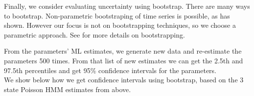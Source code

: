 \documentclass[bimj,fleqn]{w-art}\usepackage[]{graphicx}\usepackage[]{color}
\makeatletter
\newcommand{\hlnum}[1]{\textcolor[rgb]{0.686,0.059,0.569}{#1}}%
\newcommand{\hlcom}[1]{\textcolor[rgb]{0.678,0.584,0.686}{\textit{#1}}}%
\newcommand{\hlopt}[1]{\textcolor[rgb]{0,0,0}{#1}}%
\newcommand{\hlstd}[1]{\textcolor[rgb]{0.345,0.345,0.345}{#1}}%
\newcommand{\hlkwa}[1]{\textcolor[rgb]{0.161,0.373,0.58}{\textbf{#1}}}%
\newcommand{\hlkwb}[1]{\textcolor[rgb]{0.69,0.353,0.396}{#1}}%
\newcommand{\hlkwc}[1]{\textcolor[rgb]{0.333,0.667,0.333}{#1}}%
\newcommand{\hlkwd}[1]{\textcolor[rgb]{0.737,0.353,0.396}{\textbf{#1}}}%
\newenvironment{kframe}{%
 \def\at@end@of@kframe{}%
 \ifinner\ifhmode%
  \def\at@end@of@kframe{\end{minipage}}%
  \begin{minipage}{\columnwidth}%
 \fi\fi%
 \def\FrameCommand##1{\hskip\@totalleftmargin \hskip-\fboxsep
 \colorbox{shadecolor}{##1}\hskip-\fboxsep
     \hskip-\linewidth \hskip-\@totalleftmargin \hskip\columnwidth}%
 \MakeFramed {\advance\hsize-\width
   \@totalleftmargin\z@ \linewidth\hsize
   \@setminipage}}%
 {\par\unskip\endMakeFramed%
 \at@end@of@kframe}
\newenvironment{knitrout}{}{} %
\theoremstyle{plain}
\theoremstyle{definition}
\makeatother
\begin{document}
Finally, we consider evaluating uncertainty using bootstrap.
There are many ways to bootstrap.
Non-parametric bootstraping of time series is possible, as \citet{hardle} has shown.
However our focus is not on bootstrapping techniques, so we choose a parametric approach.
See \citet{efron} for more details on bootstrapping.


From the parameters' ML estimates, we generate new data and re-estimate the parameters 500 times.
From that list of new estimates we can get the 2.5th and 97.5th percentiles and get 95\% confidence intervals for the parameters.\\

We show below how we get confidence intervals using bootstrap, based on the 3 state Poisson HMM estimates from above.

\end{document}
